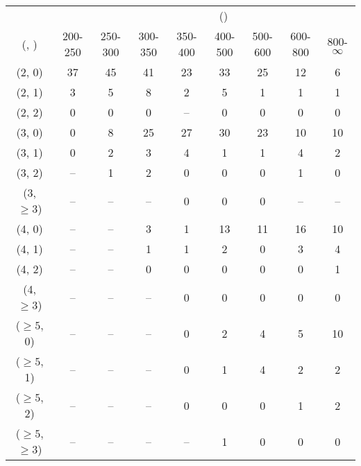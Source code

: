 \begin{table}[h!]
\tiny
\centering
{}
\begin{tabular}
{ccccccccc}
	\hline\hline
&	& \multicolumn{8}{c}{\scalht (\gev)} \\ 
	 (\njet,  \nb) & 200-250 & 250-300 & 300-350 & 350-400 & 400-500 & 500-600 & 600-800 & 800-$\infty$ \\ [0.8ex] 
\hline
	(2, 0) & 37 & 45 & 41 & 23 & 33 & 25 & 12 & 6 \\[0.5ex] 
	(2, 1) & 3 & 5 & 8 & 2 & 5 & 1 & 1 & 1 \\[0.5ex] 
	(2, 2) & 0 & 0 & 0 & -- & 0 & 0 & 0 & 0 \\[0.5ex] 
	(3, 0) & 0 & 8 & 25 & 27 & 30 & 23 & 10 & 10 \\[0.5ex] 
	(3, 1) & 0 & 2 & 3 & 4 & 1 & 1 & 4 & 2 \\[0.5ex] 
	(3, 2) & -- & 1 & 2 & 0 & 0 & 0 & 1 & 0 \\[0.5ex] 
	(3, $\ge3$) & -- & -- & -- & 0 & 0 & 0 & -- & -- \\[0.5ex] 
	(4, 0) & -- & -- & 3 & 1 & 13 & 11 & 16 & 10 \\[0.5ex] 
	(4, 1) & -- & -- & 1 & 1 & 2 & 0 & 3 & 4 \\[0.5ex] 
	(4, 2) & -- & -- & 0 & 0 & 0 & 0 & 0 & 1 \\[0.5ex] 
	(4, $\ge3$) & -- & -- & -- & 0 & 0 & 0 & 0 & 0 \\[0.5ex] 
	($\ge5$, 0) & -- & -- & -- & 0 & 2 & 4 & 5 & 10 \\[0.5ex] 
	($\ge5$, 1) & -- & -- & -- & 0 & 1 & 4 & 2 & 2 \\[0.5ex] 
	($\ge5$, 2) & -- & -- & -- & 0 & 0 & 0 & 1 & 2 \\[0.5ex] 
	($\ge5$, $\ge3$) & -- & -- & -- & -- & 1 & 0 & 0 & 0 \\[0.5ex] 
	\hline
	\hline
\end{tabular}
\end{table}
